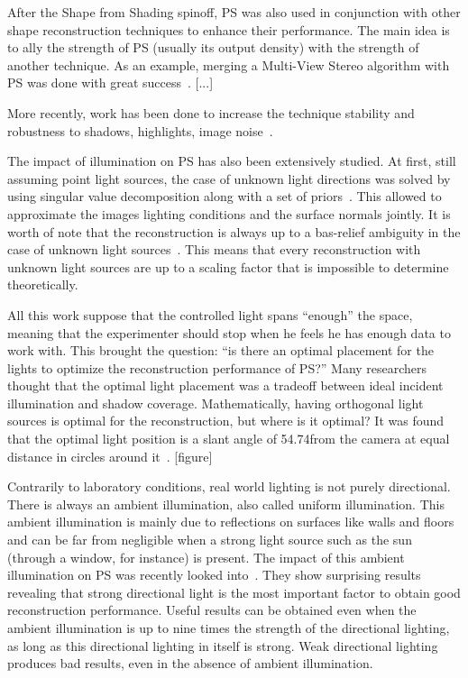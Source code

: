 \documentclass{report}
\begin{document}
After the Shape from Shading spinoff, PS was also used in conjunction with other shape reconstruction techniques to enhance their performance. The main idea is to ally the strength of PS (usually its output density) with the strength of another technique. As an example, merging a Multi-View Stereo algorithm with PS was done with great success~\cite{HernandezEsteban2008}.
[...]

More recently, work has been done to increase the technique stability and robustness to shadows, highlights, image noise~\cite{BarskyPetrou-pami-2003,ikehata-cvpr-12,ikehata-cvpr-14}.

The impact of illumination on PS has also been extensively studied. At first, still assuming point light sources, the case of unknown light directions was solved by using singular value decomposition along with a set of priors~\cite{Hayakawa1994}. This allowed to approximate the images lighting conditions and the surface normals jointly. It is worth of note that the reconstruction is always up to a bas-relief ambiguity in the case of unknown light sources~\cite{Belhumeur1999}. This means that every reconstruction with unknown light sources are up to a scaling factor that is impossible to determine theoretically.

All this work suppose that the controlled light spans ``enough'' the space, meaning that the experimenter should stop when he feels he has enough data to work with. This brought the question: ``is there an optimal placement for the lights to optimize the reconstruction performance of PS?'' Many researchers thought that the optimal light placement was a tradeoff between ideal incident illumination and shadow coverage. Mathematically, having orthogonal light sources is optimal for the reconstruction, but where is it optimal? It was found that the optimal light position is a slant angle of 54.74\degree from the camera at equal distance in circles around it~\cite{spence-iwtas-03,drbohlav-iccv-05}. [figure]

Contrarily to laboratory conditions, real world lighting is not purely directional. There is always an ambient illumination, also called uniform illumination. This ambient illumination is mainly due to reflections on surfaces like walls and floors and can be far from negligible when a strong light source such as the sun (through a window, for instance) is present. The impact of this ambient illumination on PS was recently looked into~\cite{Angelopoulou2013}. They show surprising results revealing that strong directional light is the most important factor to obtain good reconstruction performance. Useful results can be obtained even when the ambient illumination is up to nine times the strength of the directional lighting, as long as this directional lighting in itself is strong. Weak directional lighting produces bad results, even in the absence of ambient illumination.
\end{document}
